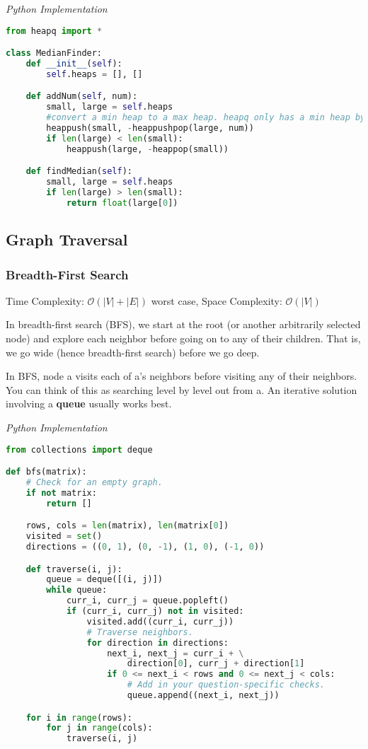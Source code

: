 \documentclass{article}
\newcommand{\bigO}{\ensuremath{\mathcal{O}}}
\begin{document}
\vspace{8pt} \emph{Python Implementation}
\begin{lstlisting}[language=Python]
from heapq import *

class MedianFinder:
    def __init__(self):
        self.heaps = [], []

    def addNum(self, num):
        small, large = self.heaps
        #convert a min heap to a max heap. heapq only has a min heap by default.
        heappush(small, -heappushpop(large, num))
        if len(large) < len(small):
            heappush(large, -heappop(small))

    def findMedian(self):
        small, large = self.heaps
        if len(large) > len(small):
            return float(large[0])
\end{lstlisting}

    \subsection{Graph Traversal}
    
    \subsubsection{Breadth-First Search}
    Time Complexity: $\bigO(|V| + |E|)$ worst case, Space Complexity: $\bigO(|V|)$
    
    In breadth-first search (BFS), we start at the root (or another arbitrarily selected node) and explore each neighbor before going on to any of their children. That is, we go wide (hence breadth-first search) before we go deep. 
    
    In BFS, node a visits each of a's neighbors before visiting any of their neighbors. You can think of this as searching level by level out from a. An iterative solution involving a \textbf{queue} usually works best. 
    
\vspace{8pt} \emph{Python Implementation}
\begin{lstlisting}[language=Python]
from collections import deque

def bfs(matrix):
    # Check for an empty graph.
    if not matrix:
        return []

    rows, cols = len(matrix), len(matrix[0])
    visited = set()
    directions = ((0, 1), (0, -1), (1, 0), (-1, 0))

    def traverse(i, j):
        queue = deque([(i, j)])
        while queue:
            curr_i, curr_j = queue.popleft()
            if (curr_i, curr_j) not in visited:
                visited.add((curr_i, curr_j))
                # Traverse neighbors.
                for direction in directions:
                    next_i, next_j = curr_i + \
                        direction[0], curr_j + direction[1]
                    if 0 <= next_i < rows and 0 <= next_j < cols:
                        # Add in your question-specific checks.
                        queue.append((next_i, next_j))

    for i in range(rows):
        for j in range(cols):
            traverse(i, j)
\end{lstlisting}
\end{document}

